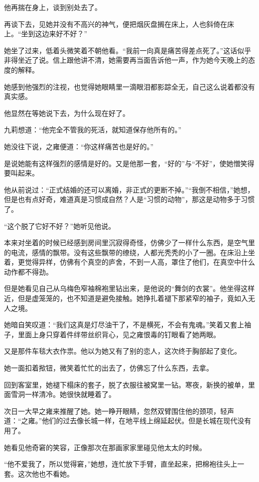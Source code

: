 \par 他再揣在身上，谈到别处去了。
\par 再谈下去，见她并没有不高兴的神气，便把烟灰盘搁在床上，人也斜倚在床上。“坐到这边来好不好？”
\par 她坐了过来，低着头微笑着不朝他看。“我前一向真是痛苦得差点死了。”这话似乎非得坐近了说。信上跟他讲不清，她需要再当面告诉他一声，作为她今天晚上的态度的解释。
\par 她感到他强烈的注视，也觉得她眼睛里一滴眼泪都影踪全无，自己这么说着都没有真实感。
\par 他显然在等她说下去，为什么现在好了。
\par 九莉想道：“他完全不管我的死活，就知道保存他所有的。”
\par 她没往下说，之雍便道：“你这样痛苦也是好的。”
\par 是说她能有这样强烈的感情是好的。又是他那一套，“好的”与“不好”，使她憎笑得要叫起来。
\par 他从前说过：“正式结婚的还可以离婚，非正式的更断不掉。”“我倒不相信，”她想，但是也有点好奇，难道真是习惯成自然？人是“习惯的动物”，那这是动物多于习惯了。
\par “这个脱了它好不好？”她听见他说。
\par 本来对坐着的时候已经感到房间里沉寂得奇怪，仿佛少了一样什么东西，是空气里的电流，感情的飘带。没有这些飘带的缭绕，人都光秃秃的小了一圈。在床沿上坐着，更觉得异样，仿佛有个真空的庐舍，不到一人高，罩住了他们，在真空中什么动作都不得劲。
\par 但是她看见自己从乌梅色窄袖棉袍里钻出来，是他说的“舞剑的衣裳”。他坐得这样近，但是虚笼笼的，也不知道是避免接触。她挣扎着褪下那紧窄的袖子，竟如入无人之境。
\par 她暗自笑叹道：“我们这真是灯尽油干了，不是横死，不会有鬼魂。”笑着又套上袖子，里面上身只穿着件绊带丝织背心，见之雍恨毒的钉眼看了她两眼。
\par 又是那件车毯大衣作祟。他以为她又有了别的恋人，这次终于胸部起了变化。
\par 她一面扣着揿钮，微笑着忙忙的出去了，仿佛忘了什么东西，去拿。
\par 回到客室里，她褪下榻床的套子，脱了衣服往被窝里一钻。寒夜，新换的被单，里面雪洞一样清冷。她很快就睡着了。
\par 次日一大早之雍来推醒了她。她一睁开眼睛，忽然双臂围住他的颈项，轻声道：“之雍。”他们的过去像长城一样，在地平线上绵延起伏。但是长城在现代没有用了。
\par 她看见他奇窘的笑容，正像那次在那画家家里碰见他太太的时候。
\par “他不爱我了，所以觉得窘，”她想，连忙放下手臂，直坐起来，把棉袍往头上一套。这次他也不看她。
